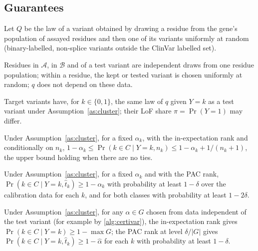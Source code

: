 \subsection{Guarantees}\label{sec:theory}

Let $Q$ be the law of a variant obtained by drawing a residue from the gene's population of assayed residues and then
one of its variants uniformly at random (binary-labelled, non-splice variants outside the ClinVar labelled set).

\begin{assumption}\label{as:cluster}
Residues in $\mathcal A$, in $\mathcal B$ and of a test variant are independent draws from one residue population;
within a residue, the kept or tested variant is chosen uniformly at random; $q$ does not depend on these data.
\end{assumption}

\begin{assumption}\label{as:shift}
Target variants have, for $k\in\{0,1\}$, the same law of $q$ given $Y=k$ as a test variant under
Assumption~\ref{as:cluster}; their LoF share $\pi=\Pr(Y=1)$ may differ.
\end{assumption}

\begin{proposition}\label{prop:mondrian}
Under Assumption~\ref{as:cluster}, for a fixed $\alpha_k$, with the in-expectation rank and conditionally on $n_k$,
$1-\alpha_k\le\Pr(k\in C\mid Y=k,n_k)\le 1-\alpha_k+1/(n_k+1)$, the upper bound holding when there are no ties.
\end{proposition}

\begin{proposition}\label{prop:pac}
Under Assumption~\ref{as:cluster}, for a fixed $\alpha_k$ and with the PAC rank, $\Pr(k\in C\mid Y=k,\hat t_k)\ge1-\alpha_k$
with probability at least $1-\delta$ over the calibration data for each $k$, and for both classes with probability at
least $1-2\delta$.
\end{proposition}

\begin{proposition}\label{prop:select}
Under Assumption~\ref{as:cluster}, for any $\hat\alpha\in G$ chosen from data independent of the test variant
(for example by \cref{alg:certivar}), the in-expectation rank gives $\Pr(k\in C\mid Y=k)\ge1-\max G$; the PAC rank at
level $\delta/|G|$ gives $\Pr(k\in C\mid Y=k,\hat t_k)\ge1-\hat\alpha$ for each $k$ with probability at least $1-\delta$.
\end{proposition}


